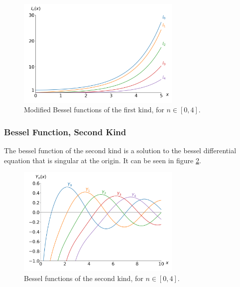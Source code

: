 \begin{figure}[h]
    \centering
    \includegraphics[width=0.7\textwidth]{figs/Inplot.png}
    \caption{Modified Bessel functions of the first kind, for $n\in[0,4]$.}
    \label{fig:Inplot}
\end{figure}

\subsubsection{Bessel Function, Second Kind}
The bessel function of the second kind is a solution to
the bessel differential equation that is singular at the
origin. It can be seen in figure \ref{fig:Ynplot}.\cite{weisstein_bessel_second_kind}

\begin{figure}[h]
    \centering
    \includegraphics[width=0.7\textwidth]{figs/Ynplot.png}
    \caption{Bessel functions of the second kind, for $n\in[0,4]$.}
    \label{fig:Ynplot}
\end{figure}

